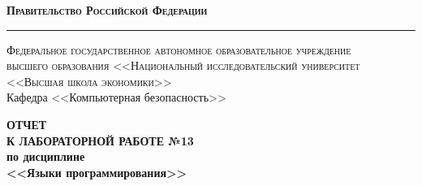 \documentclass[a4paper, 12pt]{article}
\begin{document}
\begin{titlepage}

\begin{center}
{\textsc{\textbf{Правительство Российской Федерации}}}\\
\vspace{0.5cm}
\hrule
\vspace{0.5cm}
{\textsc{Федеральное государственное автономное образовательное учреждение\\высшего образования <<Национальный исследовательский университет\\<<Высшая школа экономики>>}}\\
\vspace{1cm}
Кафедра <<Компьютерная безопасность>>
\end{center}

\vspace{\fill}
\begin{center}
{\Large{\textbf{ОТЧЕТ \\ К ЛАБОРАТОРНОЙ РАБОТЕ №13}}} \\
\vspace{1em}
{\textbf{по дисциплине}} \\
\vspace{1em}
{\large{\textbf{<<Языки программирования>>}}}
\end{center}

\vspace{\fill}


\begin{flushright}
  \begin{minipage}[center]{15cm}


\end{minipage}
\end{flushright}
\end{titlepage}
\end{document}
